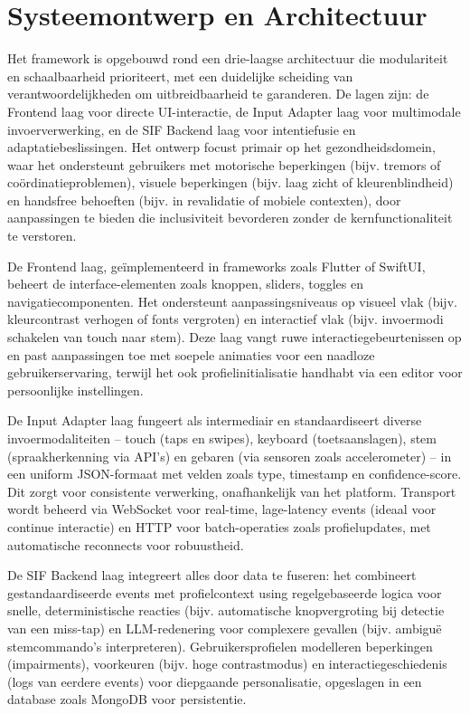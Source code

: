 \documentclass[openany]{book}
\begin{document}
\section*{Systeemontwerp en Architectuur}
Het framework is opgebouwd rond een drie-laagse architectuur die modulariteit en schaalbaarheid prioriteert, met een duidelijke scheiding van verantwoordelijkheden om uitbreidbaarheid te garanderen. De lagen zijn: de Frontend laag voor directe UI-interactie, de Input Adapter laag voor multimodale invoerverwerking, en de SIF Backend laag voor intentiefusie en adaptatiebeslissingen. Het ontwerp focust primair op het gezondheidsdomein, waar het ondersteunt gebruikers met motorische beperkingen (bijv. tremors of coördinatieproblemen), visuele beperkingen (bijv. laag zicht of kleurenblindheid) en handsfree behoeften (bijv. in revalidatie of mobiele contexten), door aanpassingen te bieden die inclusiviteit bevorderen zonder de kernfunctionaliteit te verstoren.

De Frontend laag, geïmplementeerd in frameworks zoals Flutter of SwiftUI, beheert de interface-elementen zoals knoppen, sliders, toggles en navigatiecomponenten. Het ondersteunt aanpassingsniveaus op visueel vlak (bijv. kleurcontrast verhogen of fonts vergroten) en interactief vlak (bijv. invoermodi schakelen van touch naar stem). Deze laag vangt ruwe interactiegebeurtenissen op en past aanpassingen toe met soepele animaties voor een naadloze gebruikerservaring, terwijl het ook profielinitialisatie handhabt via een editor voor persoonlijke instellingen.

De Input Adapter laag fungeert als intermediair en standaardiseert diverse invoermodaliteiten – touch (taps en swipes), keyboard (toetsaanslagen), stem (spraakherkenning via API's) en gebaren (via sensoren zoals accelerometer) – in een uniform JSON-formaat met velden zoals type, timestamp en confidence-score. Dit zorgt voor consistente verwerking, onafhankelijk van het platform. Transport wordt beheerd via WebSocket voor real-time, lage-latency events (ideaal voor continue interactie) en HTTP voor batch-operaties zoals profielupdates, met automatische reconnects voor robuustheid.

De SIF Backend laag integreert alles door data te fuseren: het combineert gestandaardiseerde events met profielcontext using regelgebaseerde logica voor snelle, deterministische reacties (bijv. automatische knopvergroting bij detectie van een miss-tap) en LLM-redenering voor complexere gevallen (bijv. ambiguë stemcommando's interpreteren). Gebruikersprofielen modelleren beperkingen (impairments), voorkeuren (bijv. hoge contrastmodus) en interactiegeschiedenis (logs van eerdere events) voor diepgaande personalisatie, opgeslagen in een database zoals MongoDB voor persistentie.
\end{document}
